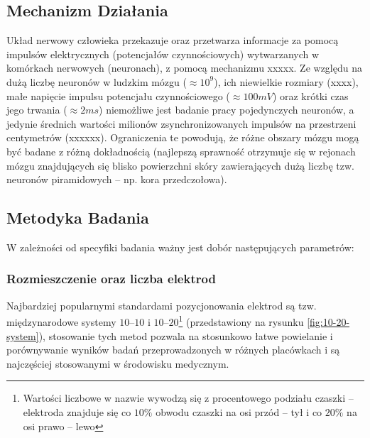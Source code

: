 \documentclass{./assets/wfis}
\begin{document}
\subsection{Mechanizm Działania}
Układ nerwowy człowieka przekazuje oraz przetwarza informacje za pomocą impulsów elektrycznych (potencjałów czynnościowych) wytwarzanych w komórkach nerwowych (neuronach), z pomocą mechanizmu xxxxx. Ze względu na dużą liczbę neuronów w ludzkim mózgu ($\approx10^9$\cite{herculano-houzel_human_2009}), ich niewielkie rozmiary (xxxx), małe napięcie impulsu potencjału czynnościowego ($\approx100mV$\cite{biga_anatomy_2019}) oraz krótki czas jego trwania ($\approx2ms$\cite{biga_anatomy_2019}) niemożliwe jest badanie pracy pojedynczych neuronów, a jedynie średnich wartości milionów zsynchronizowanych impulsów na przestrzeni centymetrów (xxxxxx). Ograniczenia te powodują, że różne obszary mózgu mogą być badane z różną dokładnością (najlepszą sprawność otrzymuje się w rejonach mózgu znajdujących się blisko powierzchni skóry zawierających dużą liczbę tzw. neuronów piramidowych \cite{}– np. kora przedczołowa\cite{}).

\subsection{Metodyka Badania}
W zależności od specyfiki badania ważny jest dobór następujących parametrów:

\subsubsection{Rozmieszczenie oraz liczba elektrod}
Najbardziej popularnymi standardami pozycjonowania elektrod są tzw. międzynarodowe systemy $10$–$10$ i $10$–$20$\footnote{Wartości liczbowe w nazwie wywodzą się  z procentowego podziału czaszki – elektroda znajduje się co $10\%$ obwodu czaszki na osi przód – tył i co $20\%$ na osi prawo – lewo} \cite{herbert_h_jasper_report_1958} (przedstawiony na rysunku \ref{fig:10-20-system}), stosowanie tych metod pozwala na stosunkowo łatwe powielanie i porównywanie wyników badań przeprowadzonych w różnych placówkach i są najczęściej stosowanymi w środowisku medycznym. 
\end{document}
